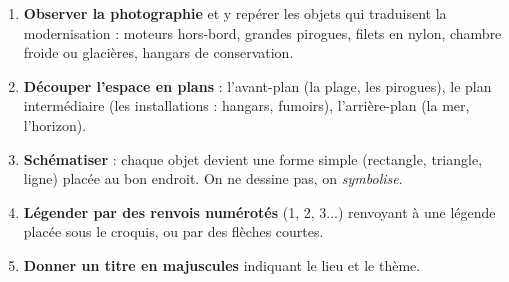 \documentclass[11pt]{article}
\begin{document}
\begin{methode}
\begin{enumerate}
\item \textbf{Observer la photographie} et y repérer les objets qui traduisent la modernisation : moteurs hors-bord, grandes pirogues, filets en nylon, chambre froide ou glacières, hangars de conservation.
\item \textbf{Découper l'espace en plans} : l'avant-plan (la plage, les pirogues), le plan intermédiaire (les installations : hangars, fumoirs), l'arrière-plan (la mer, l'horizon).
\item \textbf{Schématiser} : chaque objet devient une forme simple (rectangle, triangle, ligne) placée au bon endroit. On ne dessine pas, on \emph{symbolise}.
\item \textbf{Légender par des renvois numérotés} (1, 2, 3...) renvoyant à une légende placée sous le croquis, ou par des flèches courtes.
\item \textbf{Donner un titre en majuscules} indiquant le lieu et le thème.
\end{enumerate}
\end{methode}
\end{document}
